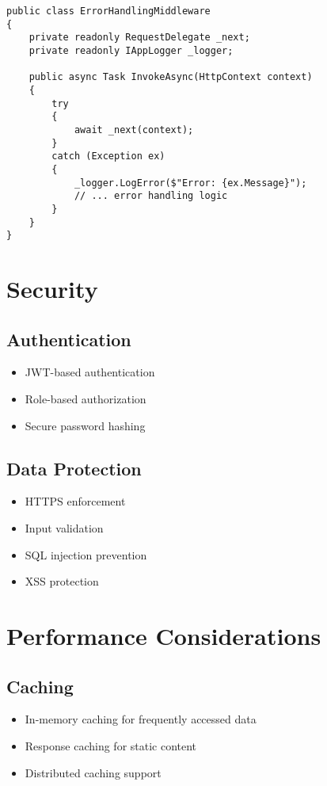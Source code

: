 \begin{lstlisting}[language=CSharp]
public class ErrorHandlingMiddleware
{
    private readonly RequestDelegate _next;
    private readonly IAppLogger _logger;

    public async Task InvokeAsync(HttpContext context)
    {
        try
        {
            await _next(context);
        }
        catch (Exception ex)
        {
            _logger.LogError($"Error: {ex.Message}");
            // ... error handling logic
        }
    }
}
\end{lstlisting}

\section{Security}

\subsection{Authentication}
\begin{itemize}
    \item JWT-based authentication
    \item Role-based authorization
    \item Secure password hashing
\end{itemize}

\subsection{Data Protection}
\begin{itemize}
    \item HTTPS enforcement
    \item Input validation
    \item SQL injection prevention
    \item XSS protection
\end{itemize}

\section{Performance Considerations}

\subsection{Caching}
\begin{itemize}
    \item In-memory caching for frequently accessed data
    \item Response caching for static content
    \item Distributed caching support
\end{itemize}

